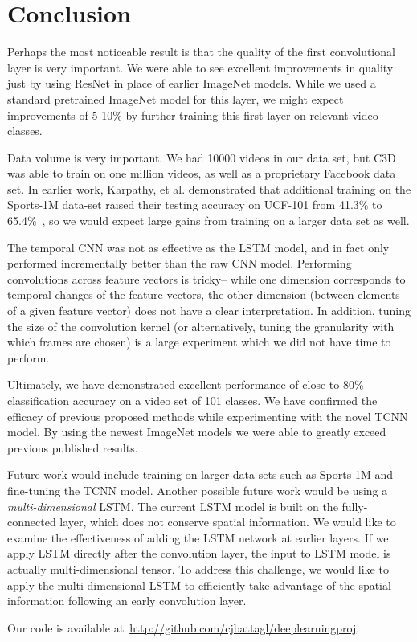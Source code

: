 \section{Conclusion}
Perhaps the most noticeable result is that the quality of the first convolutional layer is very important. We were able to see excellent improvements in quality just by using ResNet in place of earlier ImageNet models. While we used a standard pretrained ImageNet model for this layer, we might expect improvements of 5-10\% by further training this first layer on relevant video classes. 

Data volume is very important. We had 10000 videos in our data set, but C3D was able to train on one million videos, as well as a proprietary Facebook data set. In earlier work, Karpathy, et al. demonstrated that additional training on the Sports-1M data-set raised their testing accuracy on UCF-101 from 41.3\% to 65.4\%~\cite{cnnvid}, so we would expect large gains from training on a larger data set as well.

The temporal CNN was not as effective as the LSTM model, and in fact only performed incrementally better than the raw CNN model. Performing convolutions across feature vectors is tricky-- while one dimension corresponds to temporal changes of the feature vectors, the other dimension (between elements of a given feature vector) does not have a clear interpretation. In addition, tuning the size of the convolution kernel (or alternatively, tuning the granularity with which frames are chosen) is a large experiment which we did not have time to perform. 


Ultimately, we have demonstrated excellent performance of close to 80\% classification accuracy on a video set of 101 classes. We have confirmed the efficacy of previous proposed methods while experimenting with the novel TCNN model. By using the newest ImageNet models we were able to greatly exceed previous published results. 

Future work would include training on larger data sets such as Sports-1M and fine-tuning the TCNN model. Another possible future work would be using a \emph{multi-dimensional} LSTM. The current LSTM model is built on the fully-connected layer, which does not conserve spatial information. We would like to examine the effectiveness of adding the LSTM network at earlier layers. If we apply LSTM directly after the convolution layer, the input to LSTM model is actually multi-dimensional tensor. To address this challenge, we would like to apply the multi-dimensional LSTM
\cite{byeon2015scene} to efficiently take advantage of the spatial information following an early convolution layer. 

Our code is available at~\url{http://github.com/cjbattagl/deeplearningproj}.
